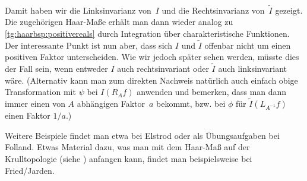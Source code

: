 \begin{BspList}[\label{tg:haarbsp}]
\begin{align*}
    \end{align*}
    Damit haben wir die Linksinvarianz von~$I$ und die Rechtsinvarianz
    von~$\tilde I$ gezeigt. Die zugehörigen Haar-Maße erhält man dann wieder
    analog zu \ref{tg:haarbsp:positivereals} durch Integration über
    charakteristische Funktionen. Der interessante Punkt ist nun aber, dass sich
    $I$ und $\tilde I$ offenbar nicht um einen positiven Faktor unterscheiden.
    Wie wir jedoch später 
    sehen werden, müsste dies der Fall sein, wenn entweder $I$ auch
    rechtsinvariant oder $\tilde I$ auch linksinvariant wäre.
    (Alternativ kann man zum direkten Nachweis natürlich auch einfach obige
    Transformation mit $\psi$ bei $I(R_Af)$ anwenden und bemerken, dass man dann
    immer einen von $A$ abhängigen Faktor~$a$ bekommt, bzw. bei $\phi$ für
    $\tilde I(L_{A^{-1}}f)$ einen Faktor $1/a$.)
    
\end{BspList}
%
Weitere Beispiele findet man etwa bei
Elstrod\cite[Kap.\,VIII,\;\S3,~und~3.14]{bookc:elstrod11}
oder als Übungsaufgaben bei 
Folland\cite[Ch.\,11,\;\S11.1,\;Exercises]{bookc:folland99}.
%
Etwas Material dazu, was man mit dem Haar-Maß auf der Krulltopologie (siehe
) anfangen kann, findet man beispielsweise bei
Fried/Jarden\cite[Ch.\,18,~insb.\,18.5\,ff.]{bookc:fried05}.


































